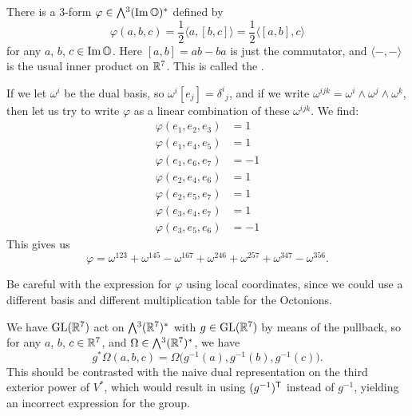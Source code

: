 There is a 3-form $\varphi\in\Exterior^{3}(\Im\OO)^{*}$ defined by
\begin{equation}
\varphi(a, b, c) = \frac{1}{2}\langle a, [b,c]\rangle =\frac{1}{2}\langle[a,b],c\rangle
\end{equation}
for any $a$, $b$, $c\in\operatorname{Im}\mathbb{O}$. Here $[a,b]=ab-ba$ is just the
commutator, and $\langle-,-\rangle$ is the usual inner product on
$\mathbb{R}^{7}$. This is called the .

If we let $\omega^{i}$ be the dual basis, so
$\omega^{i}[e_{j}]={\delta^{i}}_{j}$, and if we write
$\omega^{ijk}=\omega^{i}\wedge\omega^{j}\wedge\omega^{k}$, then let us
try to write $\varphi$ as a linear combination of these $\omega^{ijk}$.
We find:
\begin{subequations}
\begin{align}
  \varphi(e_{1},e_{2},e_{3})&=1\\
  \varphi(e_{1},e_{4},e_{5})&=1\\
  \varphi(e_{1},e_{6},e_{7})&=-1\\
  \varphi(e_{2},e_{4},e_{6})&=1\\
  \varphi(e_{2},e_{5},e_{7})&=1\\
  \varphi(e_{3},e_{4},e_{7})&=1\\
  \varphi(e_{3},e_{5},e_{6})&=-1
\end{align}
\end{subequations}
This gives us
\begin{equation}
\varphi = \omega^{123} + \omega^{145} - \omega^{167} + \omega^{246} +
\omega^{257} + \omega^{347} - \omega^{356}.
\end{equation}

\begin{ddanger}
Be careful with the expression for $\varphi$ using local coordinates,
since we could use a different basis and different multiplication table
for the Octonions.
\end{ddanger}

We have $\operatorname{GL}(\mathbb{R}^{7})$ act on $\Exterior^{3}(\RR^{7})^{*}$ with
$g\in\operatorname{GL}(\mathbb{R}^{7})$ by means of the pullback, so for any $a$, $b$,
$c\in\mathbb{R}^{7}$, and $\Omega\in\Exterior^{3}(\RR^{7})^{*}$, we have
\begin{equation}
g^{*}\Omega(a,b,c) = \Omega\bigl(g^{-1}(a), g^{-1}(b), g^{-1}(c)\bigr).
\end{equation}
This should be contrasted with the naive dual representation on the
third exterior power of $V^{*}$, which would result in using
$(g^{-1})^{\mathsf{T}}$ instead of $g^{-1}$, yielding an incorrect
expression for the group.

